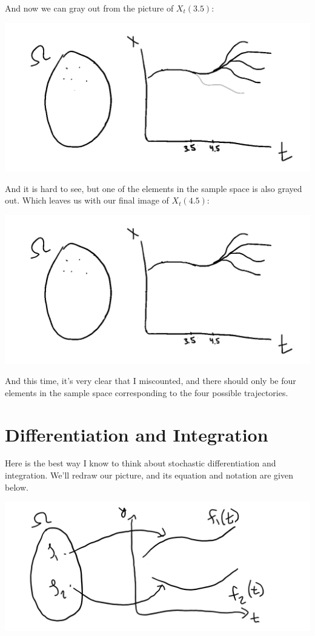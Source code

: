 \documentclass{article}
\begin{document}
And now we can gray out from the picture of $X_t(3.5)$:

\includegraphics[width=\textwidth]{Filtration_grayed_4.5.png}

And it is hard to see, but one of the elements in the sample space is also grayed out. Which leaves us with our final image of $X_t(4.5)$:

\includegraphics[width=\textwidth]{final_4.5.png}

And this time, it's very clear that I miscounted, and there should only be four elements in the sample space corresponding to the four possible trajectories.





\section{Differentiation and Integration}
Here is the best way I know to think about stochastic differentiation and integration. We'll redraw our picture, and its equation and notation are given below.

\includegraphics[width=\textwidth]{stochastic_ image.png}
\end{document}

